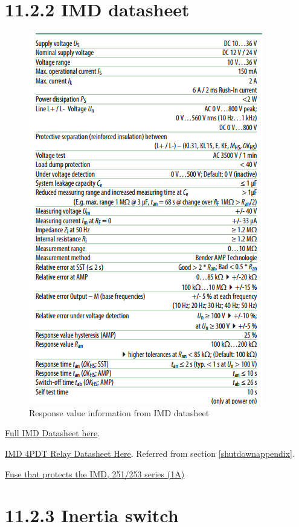 \documentclass{article}
\begin{document}
\section*{11.2.2 IMD datasheet} \label{IMDRepTime}
\begin{figure}[H]
    \centering
    \includegraphics[width=0.45 \textheight]{IMD_datasheet_snip}
    \caption{Response value information from IMD datasheet}
    \label{IMDresponsetime}
\end{figure}

\href{http://www.bender.org/documents/IR155-10_datasheet_NAE1012821.pdf}{Full IMD Datasheet here}. 

\href{http://www.automationdirect.com/static/specs/78relays.pdf}{IMD 4PDT Relay Datasheet Here}. Referred from section \ref{shutdownappendix}.

\href{http://www.littelfuse.com/~/media/electronics/datasheets/fuses/littelfuse_fuse_251_253_datasheet.pdf.pdf}{Fuse that protects the IMD, 251/253 series (1A)}

\section*{11.2.3 Inertia switch} \label{inertiaappendix}
\end{document}
